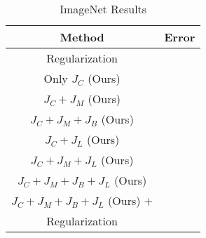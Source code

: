 \begin{table}
	\centering
	\begin{tabular}{|c|c|}
		\hline
		\textbf{Method} & \textbf{Error} \\
		\hline
		Regularization \cite{Sajjadi2016a}  & \\
		\hline
		\hline
		Only $J_C$ (Ours)  & \\
		\hline
		$J_C + J_M$ (Ours)  & \\
		\hline
		$J_C + J_M + J_B$ (Ours)  & \\
		\hline
		$J_C + J_L$ (Ours)  & \\
		\hline
		$J_C + J_M + J_L$ (Ours)  & \\
		\hline
		$J_C + J_M + J_B + J_L$ (Ours)  & \\
		\hline
		$J_C + J_M + J_B + J_L$ (Ours) $+$  & \\
		Regularization  & \\
		\hline
	\end{tabular}
	\caption{ImageNet Results}
	\label{tab:imagenet_results}
\end{table}

